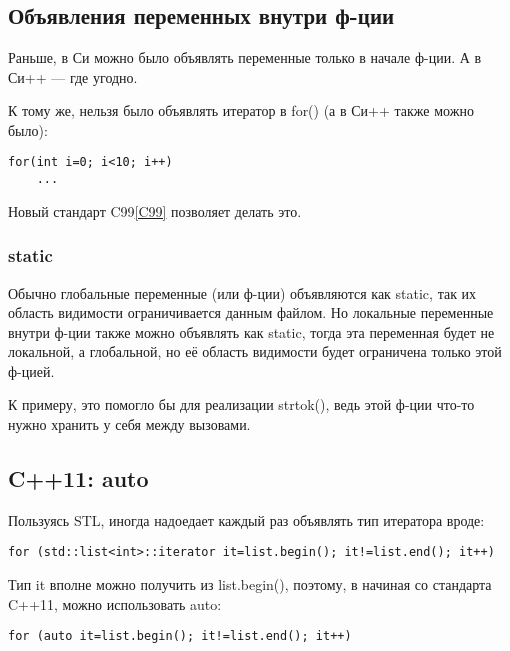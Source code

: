 ﻿\chapter{}
\section{Объявления переменных внутри ф-ции}

Раньше, в Си можно было объявлять переменные только в начале ф-ции. А в Си++ --- где угодно.

К тому же, нельзя было объявлять итератор в for() (а в Си++ также можно было):

\begin{lstlisting}
for(int i=0; i<10; i++)
	...
\end{lstlisting}

Новый стандарт C99\ref{C99} позволяет делать это.

\subsection{static}

Обычно глобальные переменные (или ф-ции) объявляются как static, так их область видимости ограничивается 
данным файлом. Но локальные переменные внутри ф-ции также можно объявлять как static, тогда эта переменная
будет не локальной, а глобальной, но её область видимости будет ограничена только этой ф-цией.

К примеру, это помогло бы для реализации strtok(), ведь этой ф-ции что-то нужно хранить у себя между вызовами.


\section{C++11: auto}

Пользуясь \ac{STL}, иногда надоедает каждый раз объявлять тип итератора вроде:

\begin{lstlisting}
for (std::list<int>::iterator it=list.begin(); it!=list.end(); it++)
\end{lstlisting}

Тип it вполне можно получить из list.begin(), поэтому, в начиная со стандарта C++11, можно использовать auto:

\begin{lstlisting}
for (auto it=list.begin(); it!=list.end(); it++)
\end{lstlisting}

